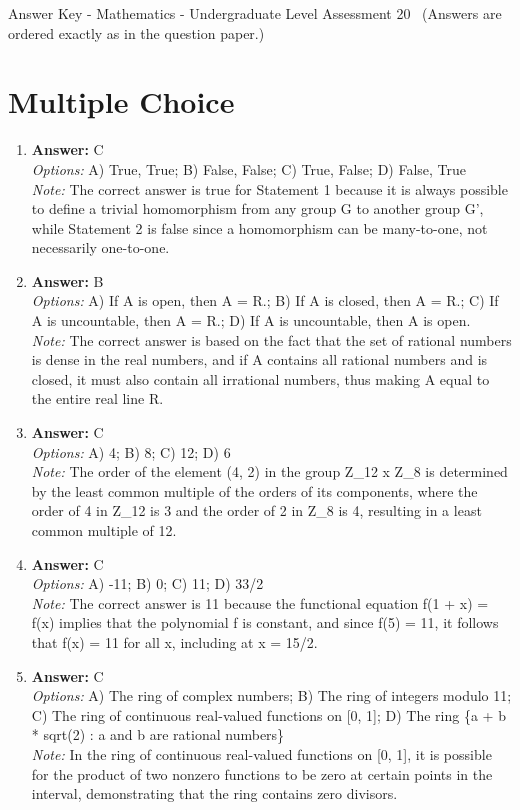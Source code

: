 \documentclass[12pt]{article}
\begin{document}
\begin{center}
Answer Key - Mathematics - Undergraduate Level Assessment 20 \
\small (Answers are ordered exactly as in the question paper.)
\end{center}

\section*{Multiple Choice}
\begin{enumerate}[label=\arabic*.]
\item \textbf{Answer:} C
\\ \textit{Options:} A) True, True; B) False, False; C) True, False; D) False, True
\\ \textit{Note:} The correct answer is true for Statement 1 because it is always possible to define a trivial homomorphism from any group G to another group G', while Statement 2 is false since a homomorphism can be many-to-one, not necessarily one-to-one.
\item \textbf{Answer:} B
\\ \textit{Options:} A) If A is open, then A = R.; B) If A is closed, then A = R.; C) If A is uncountable, then A = R.; D) If A is uncountable, then A is open.
\\ \textit{Note:} The correct answer is based on the fact that the set of rational numbers is dense in the real numbers, and if A contains all rational numbers and is closed, it must also contain all irrational numbers, thus making A equal to the entire real line R.
\item \textbf{Answer:} C
\\ \textit{Options:} A) 4; B) 8; C) 12; D) 6
\\ \textit{Note:} The order of the element (4, 2) in the group Z\_12 x Z\_8 is determined by the least common multiple of the orders of its components, where the order of 4 in Z\_12 is 3 and the order of 2 in Z\_8 is 4, resulting in a least common multiple of 12.
\item \textbf{Answer:} C
\\ \textit{Options:} A) -11; B) 0; C) 11; D) 33/2
\\ \textit{Note:} The correct answer is 11 because the functional equation f(1 + x) = f(x) implies that the polynomial f is constant, and since f(5) = 11, it follows that f(x) = 11 for all x, including at x = 15/2.
\item \textbf{Answer:} C
\\ \textit{Options:} A) The ring of complex numbers; B) The ring of integers modulo 11; C) The ring of continuous real-valued functions on [0, 1]; D) The ring \{a + b * sqrt(2) : a and b are rational numbers\}
\\ \textit{Note:} In the ring of continuous real-valued functions on [0, 1], it is possible for the product of two nonzero functions to be zero at certain points in the interval, demonstrating that the ring contains zero divisors.
\end{enumerate}
\end{document}
